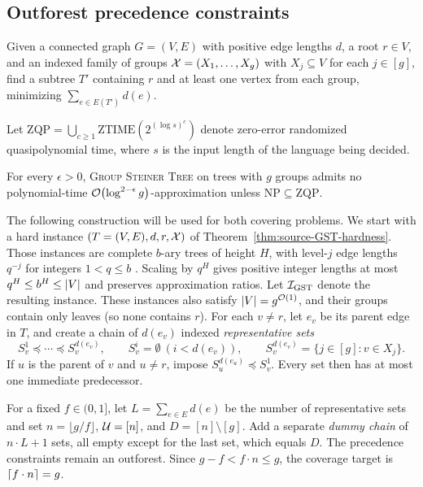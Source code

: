 \subsection{Outforest precedence constraints}
\begin{problem} \label{problem:GST}
Given a connected graph $G=(V,E)$ with positive edge lengths $d$, a root $r\in V$, and an indexed family of groups $\mathcal{X}=(X_1,\ldots,X_g)$ with $X_j\subseteq V$ for each $j\in[g]$, find a subtree $T'$ containing $r$ and at least one vertex from each group, minimizing $\sum_{e\in E(T')}d(e)$.
\end{problem}

Let $\mathrm{ZQP}=\bigcup_{c\geq1}\mathrm{ZTIME}(2^{(\log s)^c})$ denote zero-error randomized quasipolynomial time, where $s$ is the input length of the language being decided.

\begin{theorem}\label{thm:source-GST-hardness}
    For every $\epsilon>0$, \textup{\textsc{Group Steiner Tree}} on trees with $g$ groups admits no polynomial-time $\mathcal{O}\mathopen{}\left( \log^{2-\epsilon}g \right)$-approximation unless $\mathrm{NP}\subseteq\mathrm{ZQP}$.
\end{theorem}

The following construction will be used for both covering problems. We start with a hard instance $(T=(V,E),d,r,\mathcal{X})$ of Theorem~\ref{thm:source-GST-hardness}. Those instances are complete $b$-ary trees of height $H$, with level-$j$ edge lengths $q^{-j}$ for integers $1<q\leq b$ \cite[Section~3.3]{PolylogarithmicInapproximability}. Scaling by $q^H$ gives positive integer lengths at most $q^H\leq b^H\leq\mathopen{}\left| V \right|$ and preserves approximation ratios. Let $\mathcal{I}_{\mathrm{GST}}$ denote the resulting instance. These instances also satisfy $\mathopen{}\left| V \right|=g^{\mathcal{O}(1)}$, and their groups contain only leaves (so none contains $r$).
For each $v\neq r$, let $e_v$ be its parent edge in $T$, and create a chain of $d(e_v)$ indexed \emph{representative sets}
    \[
        S_v^1\preceq\cdots\preceq S_v^{d(e_v)},\qquad
        S_v^i=\emptyset\ (i<d(e_v)),\qquad
        S_v^{d(e_v)}=\{j\in[g]\colon v\in X_j\}.
    \]
    If $u$ is the parent of $v$ and $u\neq r$, impose $S_u^{d(e_u)}\preceq S_v^1$. Every set then has at most one immediate predecessor.

    For a fixed $f\in(0,1]$, let $L=\sum_{e\in E}d(e)$ be the number of representative sets and set $n=\lfloor g/f\rfloor$, $\mathcal{U}=[n]$, and $D=[n]\setminus[g]$. Add a separate \emph{dummy chain} of $n\cdot L+1$ sets, all empty except for the last set, which equals $D$. The precedence constraints remain an outforest. Since $g-f<f\cdot n\leq g$, the coverage target is $\mathopen{}\left\lceil f\cdot n \right\rceil=g$.

